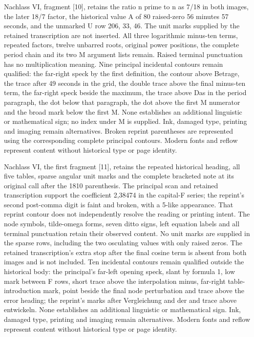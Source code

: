 Nachlass VI, fragment [10], retains the ratio n prime to n as 7/18 in both images, the later 18/7 factor, the historical value A of 80 raised-zero 56 minutes 57 seconds, and the unmarked U row 206, 33, 46. The unit marks supplied by the retained transcription are not inserted. All three logarithmic minus-ten terms, repeated factors, twelve unbarred roots, original power positions, the complete period chain and its two M argument lists remain. Raised terminal punctuation has no multiplication meaning. Nine principal incidental contours remain qualified: the far-right speck by the first definition, the contour above Betrage, the trace after 49 seconds in the grid, the double trace above the final minus-ten term, the far-right speck beside the maximum, the trace above Das in the period paragraph, the dot below that paragraph, the dot above the first M numerator and the broad mark below the first M. None establishes an additional linguistic or mathematical sign; no index under M is supplied. Ink, damaged type, printing and imaging remain alternatives. Broken reprint parentheses are represented using the corresponding complete principal contours. Modern fonts and reflow represent content without historical type or page identity.

Nachlass VI, the first fragment [11], retains the repeated historical heading, all five tables, sparse angular unit marks and the complete bracketed note at its original call after the 1810 parenthesis. The principal scan and retained transcription support the coefficient 2,38474 in the capital-F series; the reprint's second post-comma digit is faint and broken, with a 5-like appearance. That reprint contour does not independently resolve the reading or printing intent. The node symbols, tilde-omega forms, seven ditto signs, left equation labels and all terminal punctuation retain their observed content. No unit marks are supplied in the sparse rows, including the two osculating values with only raised zeros. The retained transcription's extra stop after the final cosine term is absent from both images and is not included. Ten incidental contours remain qualified outside the historical body: the principal's far-left opening speck, slant by formula 1, low mark between F rows, short trace above the interpolation minus, far-right table-introduction mark, point beside the final node perturbation and trace above the error heading; the reprint's marks after Vergleichung and der and trace above entwickeln. None establishes an additional linguistic or mathematical sign. Ink, damaged type, printing and imaging remain alternatives. Modern fonts and reflow represent content without historical type or page identity.

